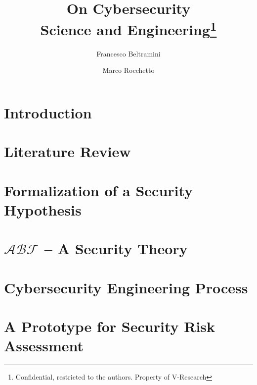 \documentclass{article}
\date{}                     %
\theoremstyle{definition}
\theoremstyle{hypothesis}
\theoremstyle{corollary}
\theoremstyle{lemma}
\theoremstyle{theorem}
\theoremstyle{theorem}
\newcommand{\assertionRegion}{\mathcal{A}}
\newcommand{\behaviorRegion}{\mathcal{B}}
\newcommand{\factRegion}{\mathcal{F}}
\begin{document}
\title{On Cybersecurity\\Science and Engineering\footnote{Confidential, restricted to the authors. Property of V-Research}}
\author[1]{Francesco Beltramini}
\author[1]{Marco Rocchetto}

\maketitle

\begin{abstract}
 
\end{abstract}
\newpage

\section{Introduction}\label{sec:intro}


\section{Literature Review}\label{sec:problem}


\section{Formalization of a Security Hypothesis}\label{sec:glossary}


\section{$\assertionRegion\behaviorRegion\factRegion$ -- A Security Theory}\label{sec:theory}


\section{Cybersecurity Engineering Process}\label{sec:engineering}


\section{A Prototype for Security Risk Assessment}\label{sec:tool}
\end{document}
